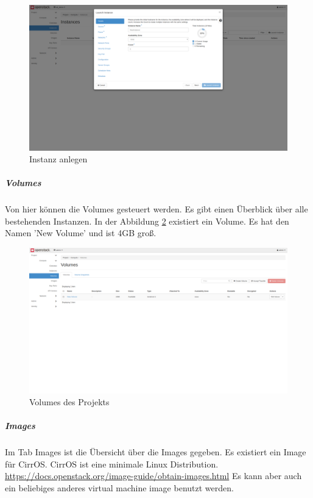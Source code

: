 \documentclass[a4paper,10pt]{article}
\numberwithin{figure}{section}
\numberwithin{table}{section}
\begin{document}
\begin{figure}[htbp]
\centering
\caption{Instanz anlegen}
\label{fig:devstack:launch_instance}
\includegraphics[width=\textwidth, trim={0 10cm 0 0}, clip]{graphics/devstack/06a_LaunchInstance}
\end{figure}

\subparagraph{Volumes}

Von hier können die Volumes gesteuert werden.
Es gibt einen Überblick über alle bestehenden Instanzen.
In der Abbildung \ref{fig:devstack:volumes} existiert ein Volume.
Es hat den Namen 'New Volume' und ist 4GB groß.

\begin{figure}[htbp]
\centering
\caption{Volumes des Projekts}
\label{fig:devstack:volumes}
\includegraphics[width=\textwidth, trim={0 17cm 0 0}, clip]{graphics/devstack/14_AddedVolume}
\end{figure}

\subparagraph{Images}

Im Tab Images ist die Übersicht über die Images gegeben.
Es existiert ein Image für CirrOS.
CirrOS ist eine minimale Linux Distribution. \url {https://docs.openstack.org/image-guide/obtain-images.html}
Es kann aber auch ein beliebiges anderes virtual machine image benutzt werden.
\end{document}
